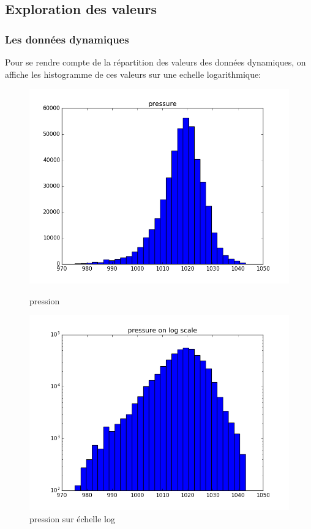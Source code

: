 \subsection{Exploration des valeurs}

\subsubsection{Les données dynamiques}

Pour se rendre compte de la répartition des valeurs des données dynamiques, on affiche les histogramme de ces valeurs sur une echelle logarithmique:

\begin{figure}[H]
\captionsetup{labelformat=empty}
  \includegraphics[width=\linewidth]{images/pression.png}
  \caption{pression}
\endminipage\hfill
{}
  \includegraphics[width=\linewidth]{images/log_pression.png}
  \caption{pression sur échelle log}
\endminipage\hfill
\end{figure}

